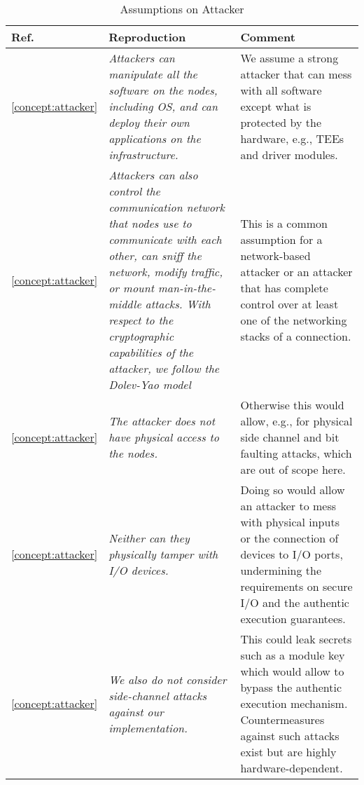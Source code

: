 \begin{longtable}{|p{}|p{}|p{}|}
\caption{Assumptions on Attacker}\\
\hline
Ref. & Reproduction & Comment \\
\hline
\hline

\ref{concept:attacker} & 
\em Attackers can manipulate all the software on the nodes, including OS, and can deploy their own applications on the infrastructure. & 
We assume a strong attacker that can mess with all software except what is protected by the hardware, e.g., TEEs and driver modules. \\
\hline

\ref{concept:attacker} & 
\em Attackers can also control the communication network that nodes use to communicate with each other, can sniff the network, modify traffic, or mount man-in-the-middle attacks. With respect to the cryptographic capabilities of the attacker, we follow the Dolev-Yao model &
This is a common assumption for a network-based attacker or an attacker that has complete control over at least one of the networking stacks of a connection. \\
\hline

\ref{concept:attacker} & 
\em The attacker does not have physical access to the nodes. &
Otherwise this would allow, e.g., for physical side channel and bit faulting attacks, which are out of scope here. \\
\hline

\ref{concept:attacker} & 
\em Neither can they physically tamper with I/O devices. &
Doing so would allow an attacker to mess with physical inputs or the connection of devices to I/O ports, undermining the requirements on secure I/O and the authentic execution guarantees. \\
\hline

\ref{concept:attacker} & 
\em We also do not consider side-channel attacks against our implementation. &
This could leak secrets such as a module key which would allow to bypass the authentic execution mechanism. Countermeasures against such attacks exist but are highly hardware-dependent.\\
\hline

\end{longtable}

